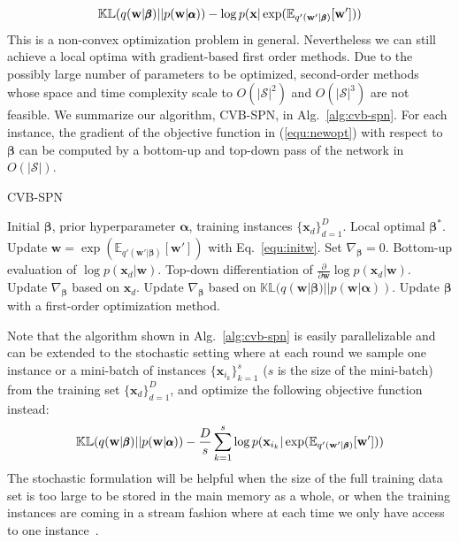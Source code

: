 \documentclass{article} %
\theoremstyle{definition}
\begin{document}
\begin{equation}
\small
\mathbb{KL}(q(\mathbf{w}|\pmb\beta) || p(\mathbf{w}|\pmb\alpha)) - \log p(\mathbf{x}|\exp(\mathbb{E}_{q'(\mathbf{w}'|\pmb\beta)}[\mathbf{w}']))
\label{equ:newopt}
\end{equation}
This is a non-convex optimization problem in general. Nevertheless we can still achieve a local optima with gradient-based first order methods. Due to the possibly large number of parameters to be optimized, second-order methods whose space and time complexity scale to $O(|\mathcal{S}|^2)$ and $O(|\mathcal{S}|^3)$ are not feasible. We summarize our algorithm, CVB-SPN, in Alg.~\ref{alg:cvb-spn}. For each instance, the gradient of the objective function in (\ref{equ:newopt}) with respect to $\pmb\beta$ can be computed by a bottom-up and top-down pass of the network in $O(|\mathcal{S}|)$. 
\begin{algorithm}[htb]
\caption{CVB-SPN}
\label{alg:cvb-spn}
\centering
\begin{algorithmic}[1]
\REQUIRE	Initial $\pmb\beta$, prior hyperparameter $\pmb\alpha$, training instances $\{\mathbf{x}_d\}_{d=1}^D$.
\ENSURE	Local optimal $\pmb\beta^*$.
	\STATE	Update $\mathbf{w} = \exp(\mathbb{E}_{q'(\mathbf{w}'|\pmb\beta)}[\mathbf{w}'])$ with Eq.~\ref{equ:initw}.
	\STATE	Set $\nabla_{\pmb\beta} = 0$.
		\STATE	Bottom-up evaluation of $\log p(\mathbf{x}_d|\mathbf{w})$.
		\STATE	Top-down differentiation of $\frac{\partial}{\partial\mathbf{w}}\log p(\mathbf{x}_d|\mathbf{w})$.
		\STATE	Update $\nabla_{\pmb\beta}$ based on $\mathbf{x}_d$.
	\ENDFOR
	\STATE	Update $\nabla_{\pmb\beta}$ based on $\mathbb{KL}(q(\mathbf{w}|\pmb\beta)||p(\mathbf{w}|\pmb\alpha))$.
	\STATE	Update $\pmb\beta$ with a first-order optimization method. 
\ENDWHILE
\end{algorithmic}
\end{algorithm}
Note that the algorithm shown in Alg.~\ref{alg:cvb-spn} is easily parallelizable and can be extended to the stochastic setting where at each round we sample one instance or a mini-batch of instances $\{\mathbf{x}_{i_k}\}_{k=1}^s$ ($s$ is the size of the mini-batch) from the training set $\{\mathbf{x}_d\}_{d=1}^D$, and optimize the following objective function instead:
\begin{equation*}
\small
\mathbb{KL}(q(\mathbf{w}|\pmb\beta) || p(\mathbf{w}|\pmb\alpha)) -\frac{D}{s}\sum_{k=1}^s\log p(\mathbf{x}_{i_k}|\exp(\mathbb{E}_{q'(\mathbf{w}'|\pmb\beta)}[\mathbf{w}']))
\end{equation*}
The stochastic formulation will be helpful when the size of the full training data set is too large to be stored in the main memory as a whole, or when the training instances are coming in a stream fashion where at each time we only have access to one instance~\cite{hoffman2013stochastic}. 
\end{document}
